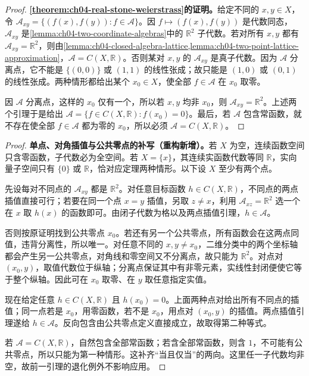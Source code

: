 \documentclass[../../main.tex]{subfiles}%
\begin{document}
\begin{proof}
\textbf{\cref{theorem:ch04-real-stone-weierstrass}的证明。}给定不同的 $x,y\in X$，令 $\mathcal A_{xy}=\{(f(x),f(y)):f\in\mathcal A\}$。因 $f\mapsto(f(x),f(y))$ 是代数同态，$\mathcal A_{xy}$ 是\cref{lemma:ch04-two-coordinate-algebras}中的 $\mathbb R^2$ 子代数。若对所有 $x,y$ 都有 $\mathcal A_{xy}=\mathbb R^2$，则由\cref{lemma:ch04-closed-algebra-lattice,lemma:ch04-two-point-lattice-approximation}，$\mathcal A=C(X,\mathbb R)$。否则某对 $x,y$ 的 $\mathcal A_{xy}$ 是真子代数。因为 $\mathcal A$ 分离点，它不能是 $\{(0,0)\}$ 或 $(1,1)$ 的线性张成；故只能是 $(1,0)$ 或 $(0,1)$ 的线性张成。两种情形都给出某个 $x_0\in X$，使全部 $f\in\mathcal A$ 在 $x_0$ 取零。

因 $\mathcal A$ 分离点，这样的 $x_0$ 仅有一个，所以若 $x,y$ 均非 $x_0$，则 $\mathcal A_{xy}=\mathbb R^2$。上述两个引理于是给出 $\mathcal A=\{f\in C(X,\mathbb R):f(x_0)=0\}$。最后，若 $\mathcal A$ 包含常函数，就不存在使全部 $f\in\mathcal A$ 都为零的 $x_0$，所以必须 $\mathcal A=C(X,\mathbb R)$。
\end{proof}
\begin{proof}
\textbf{单点、对角插值与公共零点的补写（重构新增）。}若 $X$ 为空，连续函数空间只含零函数，子代数必为全空间。若 $X=\{x\}$，其连续实函数代数等同 $\mathbb R$，实向量子空间只有 $\{0\}$ 或 $\mathbb R$，恰对应定理两种情形。以下设 $X$ 至少有两个点。

先设每对不同点的 $\mathcal A_{xy}$ 都是 $\mathbb R^2$。对任意目标函数 $h\in C(X,\mathbb R)$，不同点的两点插值直接可行；若要在同一个点 $x=y$ 插值，另取 $z\ne x$，利用 $\mathcal A_{xz}=\mathbb R^2$ 选一个在 $x$ 取 $h(x)$ 的函数即可。由闭子代数为格以及两点插值引理，$h\in\mathcal A$。

否则按原证明找到公共零点 $x_0$。若还有另一个公共零点，所有函数会在这两点同值，违背分离性，所以唯一。对任意不同的 $x,y\ne x_0$，二维分类中的两个坐标轴都会产生另一公共零点，对角线和零空间又不分离点，故只能为 $\mathbb R^2$。对点对 $(x_0,y)$，取值代数位于纵轴；分离点保证其中有非零元素，实线性封闭便使它等于整个纵轴。因此可在 $x_0$ 取零、在 $y$ 取任意指定实值。

现在给定任意 $h\in C(X,\mathbb R)$ 且 $h(x_0)=0$。上面两种点对给出所有不同点的插值；同一点若是 $x_0$，用零函数，若不是 $x_0$，用点对 $(x_0,y)$ 的插值。两点插值引理遂给 $h\in\mathcal A$。反向包含由公共零点定义直接成立，故取得第二种等式。

若 $\mathcal A=C(X,\mathbb R)$，自然包含全部常函数；若含全部常函数，则含 $1$，不可能有公共零点，所以只能为第一种情形。这补齐“当且仅当”的两向。这里任一子代数均非空，故前一引理的退化例外不影响应用。
\end{proof}
\end{document}
